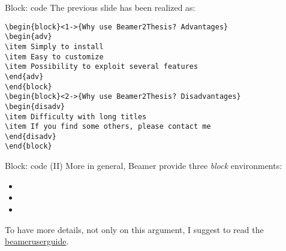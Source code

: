 \begin{frame}[t,fragile]{Block: code}
The previous slide has been realized as:
\small{\begin{verbatim}
\begin{block}<1->{Why use Beamer2Thesis? Advantages}
\begin{adv}
\item Simply to install
\item Easy to customize
\item Possibility to exploit several features
\end{adv}
\end{block}
\begin{block}<2->{Why use Beamer2Thesis? Disadvantages}
\begin{disadv}
\item Difficulty with long titles
\item If you find some others, please contact me 
\end{disadv}
\end{block}
\end{verbatim}}
\end{frame}

\begin{frame}[t,fragile]{Block: code (II)}
More in general, Beamer provide three \emph{block} environments:
\begin{itemize}
\item {}
\item {}
\item {}
\end{itemize}
To have more details, not only on this argument, I suggest to read the \href{http://mirrors.ctan.org/macros/latex/contrib/beamer/doc/beameruserguide.pdf}{beameruserguide}.
\end{frame}